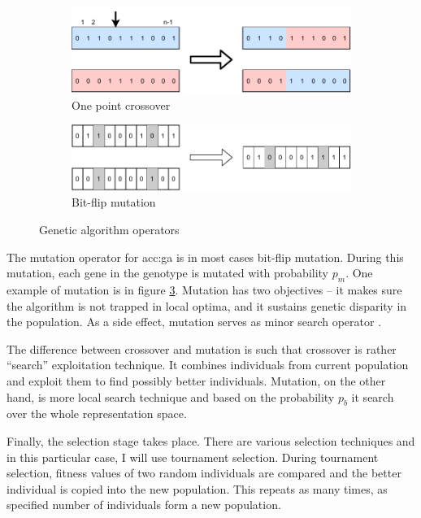 \begin{figure}
    \begin{subfigure}[b]{0.4\textwidth}
        \includegraphics[width=\textwidth]{img/master_onepointcrossover.pdf}
        \caption{One point crossover}
        \label{fig:gaonepointcrossover}
    \end{subfigure}
    \hfill
    \begin{subfigure}[b]{0.4\textwidth}
        \includegraphics[width=\textwidth]{img/master_bitflipmutation.pdf}
        \caption{Bit-flip mutation}
        \label{fig:bitflipmutation}
    \end{subfigure}
    \caption{Genetic algorithm operators}
\end{figure}

The mutation operator for \acrshort{acc:ga} is in most cases bit-flip mutation. During this mutation, each gene in the genotype is mutated with probability $p_m$. One example of mutation is in figure \ref{fig:bitflipmutation}. Mutation has two objectives -- it makes sure the algorithm is not trapped in local optima, and it sustains genetic disparity in the population. As a side effect, mutation serves as minor search operator \citep{IntroToGA}.

The difference between crossover and mutation is such that crossover is rather \enquote{search} exploitation technique. It combines individuals from current population and exploit them to find possibly better individuals. Mutation, on the other hand, is more local search technique and based on the probability $p_b$ it search over the whole representation space.

Finally, the selection stage takes place. There are various selection techniques and in this particular case, I will use tournament selection. During tournament selection, fitness values of two random individuals are compared and the better individual is copied into the new population. This repeats as many times, as specified number of individuals form a new population.


